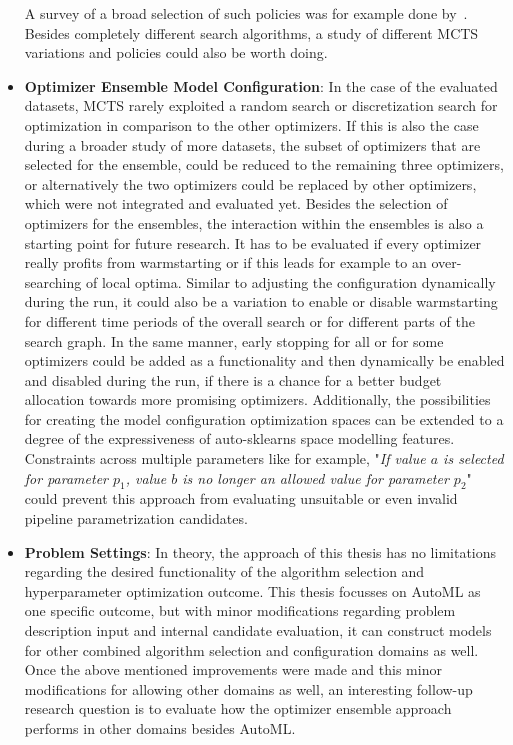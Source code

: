 \begin{itemize}
    A survey of a broad selection of such policies was for example done by~\textcite{Browne-Policies}.
    Besides completely different search algorithms, a study of different MCTS variations and policies could also be worth doing.
    \item \textbf{Optimizer Ensemble Model Configuration}: In the case of the evaluated datasets, MCTS rarely exploited a random search or discretization search for optimization in comparison to the other optimizers.
    If this is also the case during a broader study of more datasets, the subset of optimizers that are selected for the ensemble, could be reduced to the remaining three optimizers, or alternatively the two optimizers could be replaced by other optimizers, which were not integrated and evaluated yet.\newline
    Besides the selection of optimizers for the ensembles, the interaction within the ensembles is also a starting point for future research.
    It has to be evaluated if every optimizer really profits from warmstarting or if this leads for example to an over-searching of local optima.\newline
    Similar to adjusting the configuration dynamically during the run, it could also be a variation to enable or disable warmstarting for different time periods of the overall search or for different parts of the search graph.
    In the same manner, early stopping for all or for some optimizers could be added as a functionality and then dynamically be enabled and disabled during the run, if there is a chance for a better budget allocation towards more promising optimizers.\newline
    Additionally, the possibilities for creating the model configuration optimization spaces can be extended to a degree of the expressiveness of auto-sklearns space modelling features.
    Constraints across multiple parameters like for example, "\textit{If value $a$ is selected for parameter $p_1$, value $b$ is no longer an allowed value for parameter $p_2$}" could prevent this approach from evaluating unsuitable or even invalid pipeline parametrization candidates.
    \item \textbf{Problem Settings}: In theory, the approach of this thesis has no limitations regarding the desired functionality of the algorithm selection and hyperparameter optimization outcome.
    This thesis focusses on AutoML as one specific outcome, but with minor modifications regarding problem description input and internal candidate evaluation, it can construct models for other combined algorithm selection and configuration domains as well.\newline
    Once the above mentioned improvements were made and this minor modifications for allowing other domains as well, an interesting follow-up research question is to evaluate how the optimizer ensemble approach performs in other domains besides AutoML.
\end{itemize}
